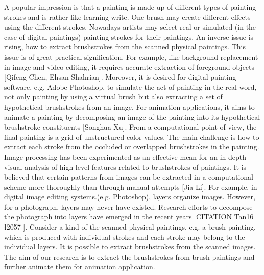 
\maketitle

A popular impression is that a painting is made up of different types of painting strokes and is rather like learning write. One brush may create different effects using the different strokes. Nowadays artists may select real or simulated (in the case of digital paintings) painting strokes for their paintings. An inverse issue is rising, how to extract brushstrokes from the scanned physical paintings. This issue is of great practical signification. For example, like background replacement in image and video editing, it requires accurate extraction of foreground objects  [Qifeng Chen, Ehsan Shahrian]. Moreover, it is desired for digital painting software, e.g. Adobe Photoshop, to simulate the act of painting in the real word, not only painting by using a virtual brush but also extracting a set of hypothetical brushstrokes from an image. For animation applications, it aims to animate a painting by decomposing an image of the painting into its hypothetical brushstroke constituents [Songhua Xu]. From a computational point of view, the final painting is a grid of unstructured color values. The main challenge is how to extract each stroke from the occluded or overlapped brushstrokes in the painting.
Image processing has been experimented as an effective mean for an in-depth visual analysis of high-level features related to brushstrokes of paintings. It is believed that certain patterns from images can be extracted in a computational scheme more thoroughly than through manual attempts [Jia Li]. For example, in digital image editing systems.(e.g. Photoshop), layers organize images. However, for a photograph, layers may never have existed. Research efforts to decompose the photograph into layers have emerged in the recent years[ CITATION Tan16 \l 2057 ].
Consider a kind of the scanned physical paintings, e.g. a brush painting, which is produced with individual strokes and each stroke may belong to the individual layers. It is possible to extract brushstrokes from the scanned images.
The aim of our research is to extract the brushstrokes from brush paintings and further animate them for animation application.
